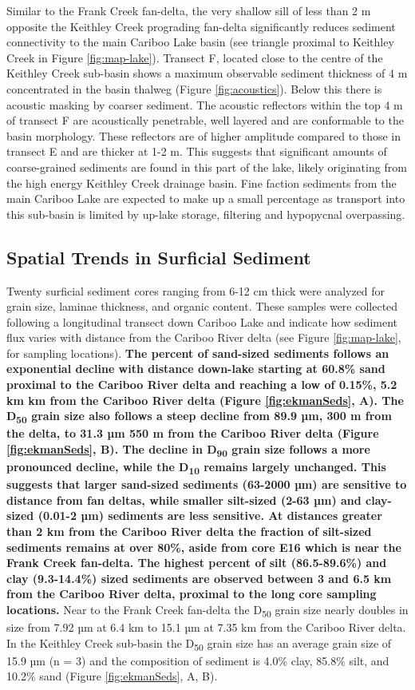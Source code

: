 \documentclass[Royal,times,doublespace,sageh]{sagej}
\begin{document}
Similar to the Frank Creek fan-delta, the very shallow sill of less than
2 m opposite the Keithley Creek prograding fan-delta significantly
reduces sediment connectivity to the main Cariboo Lake basin (see
triangle proximal to Keithley Creek in Figure \ref{fig:map-lake}).
Transect F, located close to the centre of the Keithley Creek sub-basin
shows a maximum observable sediment thickness of 4 m concentrated in the
basin thalweg (Figure \ref{fig:acoustics}). Below this there is acoustic
masking by coarser sediment. The acoustic reflectors within the top 4 m
of transect F are acoustically penetrable, well layered and are
conformable to the basin morphology. These reflectors are of higher
amplitude compared to those in transect E and are thicker at 1-2 m. This
suggests that significant amounts of coarse-grained sediments are found
in this part of the lake, likely originating from the high energy
Keithley Creek drainage basin. Fine faction sediments from the main
Cariboo Lake are expected to make up a small percentage as transport
into this sub-basin is limited by up-lake storage, filtering and
hypopycnal overpassing.

\hypertarget{spatial}{%
\subsection{Spatial Trends in Surficial Sediment}\label{spatial}}

Twenty surficial sediment cores ranging from 6-12 cm thick were analyzed
for grain size, laminae thickness, and organic content. These samples
were collected following a longitudinal transect down Cariboo Lake and
indicate how sediment flux varies with distance from the Cariboo River
delta (see Figure \ref{fig:map-lake}, for sampling locations).
\textbf{The percent of sand-sized sediments follows an exponential
decline with distance down-lake starting at 60.8\% sand proximal to the
Cariboo River delta and reaching a low of 0.15\%, 5.2 km km from the
Cariboo River delta (Figure \ref{fig:ekmanSeds}, A). The
D\textsubscript{50} grain size also follows a steep decline from 89.9
µm, 300 m from the delta, to 31.3 µm 550 m from the Cariboo River delta
(Figure \ref{fig:ekmanSeds}, B). The decline in D\textsubscript{90}
grain size follows a more pronounced decline, while the
D\textsubscript{10} remains largely unchanged. This suggests that larger
sand-sized sediments (63-2000 µm) are sensitive to distance from fan
deltas, while smaller silt-sized (2-63 µm) and clay-sized (0.01-2 µm)
sediments are less sensitive. At distances greater than 2 km from the
Cariboo River delta the fraction of silt-sized sediments remains at over
80\%, aside from core E16 which is near the Frank Creek fan-delta. The
highest percent of silt (86.5-89.6\%) and clay (9.3-14.4\%) sized
sediments are observed between 3 and 6.5 km from the Cariboo River
delta, proximal to the long core sampling locations.} Near to the Frank
Creek fan-delta the D\textsubscript{50} grain size nearly doubles in
size from 7.92 µm at 6.4 km to 15.1 µm at 7.35 km from the Cariboo River
delta. In the Keithley Creek sub-basin the D\textsubscript{50} grain
size has an average grain size of 15.9 µm (n = 3) and the composition of
sediment is 4.0\% clay, 85.8\% silt, and 10.2\% sand (Figure
\ref{fig:ekmanSeds}, A, B).
\end{document}
